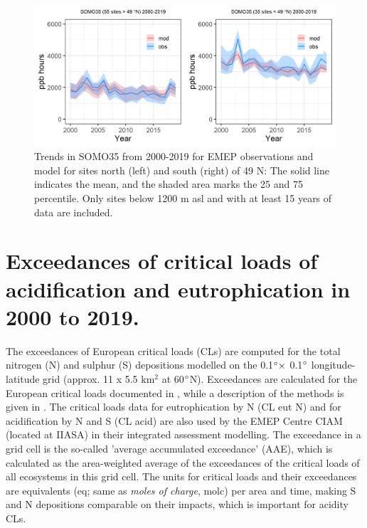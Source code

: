 \begin{figure}[h]
	\centering
	\includegraphics[width=0.74\paperwidth]{FIGS_TRENDS/SOMO35_2000_2019_1200m.png}
	\caption{\label{fig:O3_somo35trends}Trends in SOMO35 from 2000-2019 for EMEP observations and model for sites north (left) and south (right) of 49 N: The solid line indicates the mean, and the shaded area marks the 25 and 75 percentile. Only sites below 1200 m asl and with at least 15 years of data are included.}
\end{figure}

\section{Exceedances of critical loads of acidification and eutrophication in 2000 to 2019.}
\label{subs:exceedSnN}

The exceedances of European critical loads (CLs) are computed for the total nitrogen
(N) and sulphur (S) depositions modelled on the 0.1$^\circ \times$ 0.1$^\circ$
longitude-latitude grid (approx. 11 x 5.5 km$^{2}$ at 60$^\circ$N).
Exceedances are calculated for the European critical loads documented in \cite{Hettelingh:2017}, while
a description of the methods is given in \cite{DeVries:2015}. The
critical loads data for eutrophication by N (CL eut N) and for acidification by N and S
(CL acid) are also used by the EMEP Centre CIAM (located at IIASA) in their integrated assessment
modelling. The exceedance in a grid cell is the so-called ’average accumulated
exceedance’ (AAE), which is calculated as the area-weighted average of the
exceedances of the critical loads of all ecosystems in this grid cell. The units for
critical loads and their exceedances are equivalents (eq; same as \textit{moles of charge},
molc) per area and time, making S and N depositions comparable on their impacts, which is important for
acidity CLs.

